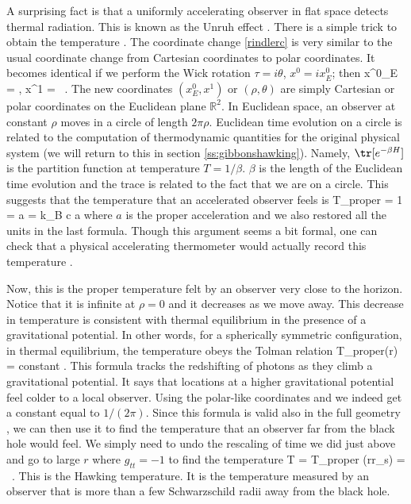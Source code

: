 A surprising fact is that a uniformly accelerating observer in flat space detects thermal radiation. 
This is known as the Unruh effect \cite{Unruh:1976db}. There is a simple trick to obtain the temperature \cite{Bisognano:1976za}. The coordinate change \eqref{rindlerc} is very similar to the usual coordinate change from Cartesian coordinates to polar coordinates. It becomes identical if we perform the Wick rotation $\tau = i \theta$, $x^0 = i x^0_E$; then
\be
x^0_E = \rho \sin \theta , \quad x^1 = \rho \cos\theta \ .
\ee
The new coordinates $(x^0_E, x^1)$ or $(\rho, \theta)$ are simply Cartesian or polar coordinates on the Euclidean plane $\mathbb{R}^2$. 
In Euclidean space, an observer at constant $\rho$ moves in a circle of length $ 2\pi \rho$. 
Euclidean time evolution on a circle is related to the computation of thermodynamic quantities for the original physical system (we will return to this in section \ref{ss:gibbonshawking}). 
Namely, $\tr[e^{ - \beta H}] $ is the partition function at temperature $T=1/\beta$. $\beta$ is the length of the Euclidean time evolution and the trace is related to the fact that we are on a circle. This suggests that the temperature that an accelerated observer feels is 
\be {}
T_{proper} = { 1  \pi \rho } = { a  \pi } = { \hbar \over k_B c } { a  \pi } 
\ee 
where $a$ is the proper acceleration and we also restored all the units in the last formula. 
Though this argument seems a bit formal, one can check that a physical accelerating thermometer would actually record this temperature \cite{Unruh:1976db}. 

Now, this is the proper temperature felt by an observer very close to the horizon. Notice that it is infinite at $\rho=0$ and it decreases as we move away. This decrease in temperature is consistent with thermal equilibrium in the presence of a gravitational potential. In other words, for a spherically symmetric configuration, in thermal equilibrium, the temperature obeys the Tolman relation \cite{Tolman:1930zza} 
\be 
 T_{proper}(r) = {\rm constant .}
\ee
This formula tracks the redshifting of photons as they climb a gravitational potential. It says that locations at a higher gravitational potential feel colder to a local observer. 
 Using   
 the  polar-like coordinates   and  we   indeed get a constant equal to $1/(2\pi)$.
 Since this formula is valid also in the full geometry , we can then use it to find the temperature that an observer far from the black hole would feel. We simply need to undo the rescaling of time we did just above  and go to large $r$ where 
 $g_{tt} = -1$ to find the temperature 
 \be\label{thawking}
T %
= T_{proper} (r\gg r_s) =   \ .
\ee
This is the Hawking temperature. It is the temperature measured by an observer that is more than a few Schwarzschild radii away from the black hole.  


